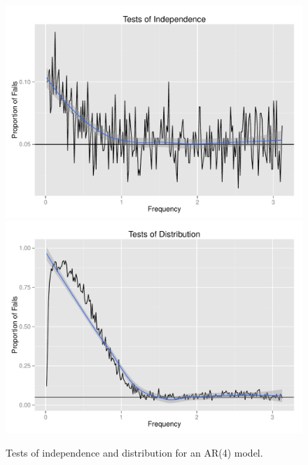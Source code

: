 \documentclass{article}\usepackage[]{graphicx}\usepackage[]{color}
\newenvironment{knitrout}{}{} %
\theoremstyle{plain}
\begin{document}
\begin{knitrout}
\color{fgcolor}\begin{figure}[H]

\includegraphics[width=.49\textwidth]{figure/tests-ar41} 
\includegraphics[width=.49\textwidth]{figure/tests-ar42} \caption[Tests of independence and distribution for an AR(4) model]{Tests of independence and distribution for an AR(4) model.\label{fig:tests-ar4}}
\end{figure}


\end{knitrout}
\end{document}
